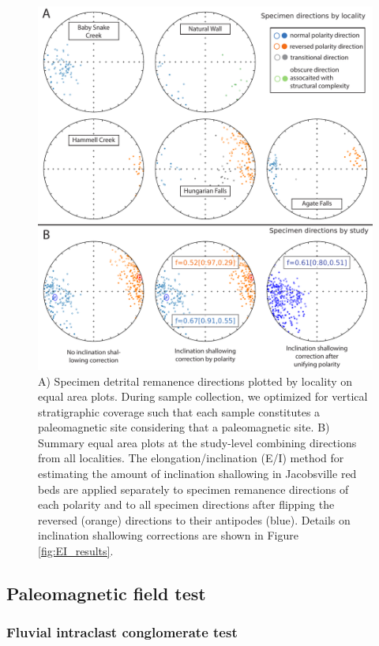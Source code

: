 \documentclass[draft]{agujournal2019}
\begin{document}
\begin{figure}[h!]
\centering
\includegraphics[width=\textwidth]{in_situ_pmag.pdf}
\caption{A) Specimen detrital remanence directions plotted by locality on equal area plots. During sample collection, we optimized for vertical stratigraphic coverage such that each sample constitutes a paleomagnetic site considering that a paleomagnetic site. B) Summary equal area plots at the study-level combining directions from all localities. The elongation/inclination (E/I) method \cite{Tauxe2004b} for estimating the amount of inclination shallowing in Jacobsville red beds are applied separately to specimen remanence directions of each polarity and to all specimen directions after flipping the reversed (orange) directions to their antipodes (blue). Details on inclination shallowing corrections are shown in Figure \ref{fig:EI_results}.}
\label{fig:in_situ_pmag}
\end{figure}


\subsection*{Paleomagnetic field test}

\subsubsection*{Fluvial intraclast conglomerate test}
\end{document}

